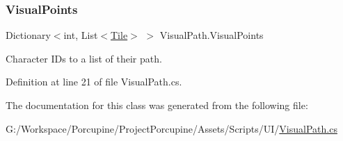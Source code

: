 \subsubsection{\texorpdfstring{Visual\+Points}{VisualPoints}}
{\footnotesize\ttfamily Dictionary$<$int, List$<$\hyperlink{class_tile}{Tile}$>$ $>$ Visual\+Path.\+Visual\+Points\hspace{0.3cm}{\ttfamily [get]}}



Character I\+Ds to a list of their path. 



Definition at line 21 of file Visual\+Path.\+cs.



The documentation for this class was generated from the following file\+:\begin{DoxyCompactItemize}
\item 
G\+:/\+Workspace/\+Porcupine/\+Project\+Porcupine/\+Assets/\+Scripts/\+U\+I/\hyperlink{_visual_path_8cs}{Visual\+Path.\+cs}\end{DoxyCompactItemize}

